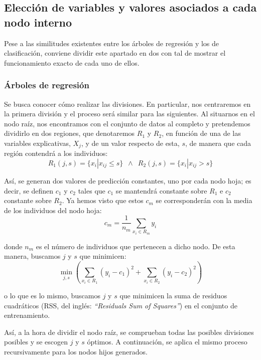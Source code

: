 \documentclass[12pt,twoside]{article}
\begin{document}
\subsection{Elección de variables y valores asociados a cada nodo interno} \label{sec: subsec22}

Pese a las similitudes existentes entre los árboles de regresión y los de clasificación, conviene dividir este apartado en dos con tal de mostrar el funcionamiento exacto de cada uno de ellos.


\subsubsection{Árboles de regresión}
Se busca conocer cómo realizar las divisiones. En particular, nos centraremos en la primera división y el proceso será similar para las siguientes. Al situarnos en el nodo raíz, nos encontramos con el conjunto de datos al completo y pretendemos dividirlo en dos regiones, que denotaremos $R_1$ y $R_2$, en función de una de las variables explicativas, $X_j$, y de un valor respecto de esta, $s$, de manera que cada región contendrá a los individuos:
\begin{equation*}
R_1 (j,s) = \{ x_i | x_{ij} \leq s \} \, \, \, \wedge \, \, \,  R_2 (j,s) = \{ x_{i} | x_{ij} > s\}
\end{equation*}

Así, se generan dos valores de predicción constantes, uno por cada nodo hoja; es decir, se definen $c_1$ y $c_2$ tales que $c_1$ se mantendrá constante sobre $R_1$ e $c_2$ constante sobre $R_2$. Ya hemos visto que estos $c_m$ se corresponderán con la media de los individuos del nodo hoja:
\begin{equation*}
c_m = \frac{1}{n_m}\sum_{x_i \in R_m} y_i
\end{equation*}

\noindent
donde $n_m$ es el número de individuos que pertenecen a dicho nodo. De esta manera, buscamos $j$ y $s$ que minimicen:
\begin{equation*}
\min_{j,s} \left( \sum_{x_i \in R_1}(y_i - c_1)^2 + \sum_{x_i \in R_2}(y_i - c_2)^2 \right)
\end{equation*}

\noindent
o lo que es lo mismo, buscamos $j$ y $s$ que minimicen la suma de residuos cuadráticos (RSS, del inglés: \textit{``Residuals Sum of Squares''}) en el conjunto de entrenamiento.

Así, a la hora de dividir el nodo raíz, se comprueban todas las posibles divisiones posibles y se escogen $j$ y $s$ óptimos. A continuación, se aplica el mismo proceso recursivamente para los nodos hijos generados.
\end{document}

